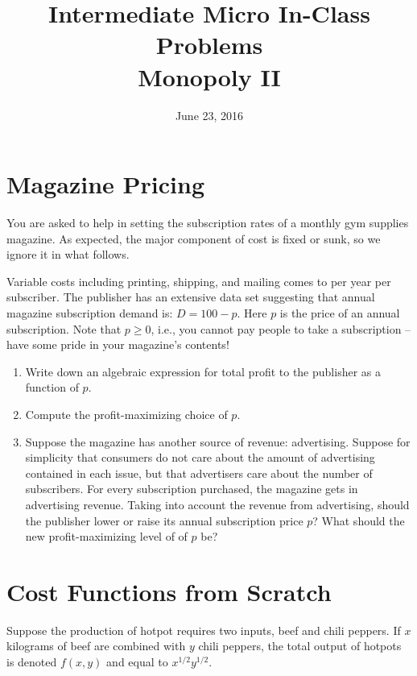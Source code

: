 \documentclass{article}
\begin{document}
\title{Intermediate Micro In-Class Problems \\ \large Monopoly II}

\date{June 23, 2016}

\maketitle

\section*{Magazine Pricing}
You are asked to help in setting the subscription rates of a monthly gym supplies magazine. As expected, the major component of cost is fixed or sunk, so we ignore it in what follows.

Variable costs including printing, shipping, and mailing comes to  per year per subscriber. The publisher has an extensive data set suggesting that annual magazine subscription demand is: $ D = 100 - p$. Here $p$ is the price of an annual subscription. Note that $p \geq 0$, i.e., you cannot pay people to take a subscription -- have some pride in your magazine's contents!

\begin{enumerate}
\item Write down an algebraic expression for total profit to the publisher as a function of $p$. 
\item Compute the profit-maximizing choice of $p$.
\item Suppose the magazine has another source of revenue: advertising. Suppose for simplicity that consumers do not care about the amount of advertising contained in each issue, but that advertisers care about the number of subscribers. For every subscription purchased, the magazine gets  in advertising revenue. Taking into account the revenue from advertising, should the publisher lower or raise its annual subscription price $p$? What should the new profit-maximizing level of of $p$ be?
\end{enumerate}

\section*{Cost Functions from Scratch}
Suppose the production of hotpot requires two inputs, beef and chili peppers. If $x$ kilograms of beef are combined with $y$ chili peppers, the total output of hotpots is denoted $f(x,y)$ and equal to $x^{1/2}y^{1/2}$. 
\end{document}
